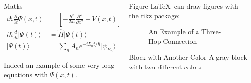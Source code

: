\documentclass{purdue-poster}
\begin{document}
\begin{frame}{}
\begin{columns}[c]
\begin{column}{.45\linewidth}
\begin{block}{Maths}
        \begin{align}
        i\hbar {\frac {\partial }{\partial t}}\Psi (x,t)&=\left[-{\frac {\hbar ^{2}}{2m}}{\frac {\partial ^{2}}{\partial x^{2}}}+V(x,t)\right]\Psi (x,t) \\
        i\hbar {\frac {d}{dt}}\vert \Psi (t)\rangle &={\hat {H}}\vert \Psi (t)\rangle \\ 
        |\Psi (t)\rangle &=\sum _{n}A_{n}e^{{-iE_{n}t}/\hbar }|\psi _{E_{n}}\rangle
        \end{align}
        
        Indeed an example of some very long equations with $\Psi (x,t)$.
    \end{block}
    
    \end{column}

    \begin{column}{.45\linewidth}
    
    \begin{block}{Figure}
        \LaTeX\ can draw figures with the tikz package:
        \begin{figure}[h]
        \centering
        \caption{An Example of a Three-Hop Connection}
        \label{fig:three-hop}
        \end{figure}
    \end{block}

    \begin{exampleblock}{Block with Another Color}
    A gray block with two different colors.
    
    \bigskip
    
    \lipsum[2]
    \end{exampleblock}


\end{column}
\end{columns}
\end{frame}
\end{document}

